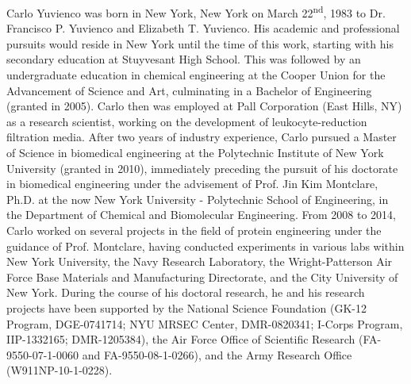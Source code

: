 Carlo Yuvienco was born in New York, New York on March 22\textsuperscript{nd},
1983 to Dr. Francisco P. Yuvienco and Elizabeth T. Yuvienco. His academic and
professional pursuits would reside in New York until the time of this work,
starting with his secondary education at Stuyvesant High School. This was
followed by an undergraduate education in chemical engineering at the Cooper
Union for the Advancement of Science and Art, culminating in a Bachelor of
Engineering (granted in 2005). Carlo then was employed at Pall Corporation (East
Hills, NY) as a research scientist, working on the development of
leukocyte-reduction filtration media. After two years of industry experience,
Carlo pursued a Master of Science in biomedical engineering at the Polytechnic
Institute of New York University (granted in 2010), immediately preceding the
pursuit of his doctorate in biomedical engineering under the advisement of Prof.
Jin Kim Montclare, Ph.D. at the now New York University - Polytechnic School of
Engineering, in the Department of Chemical and Biomolecular Engineering. From
2008 to 2014, Carlo worked on several projects in the field of protein
engineering under the guidance of Prof. Montclare, having conducted experiments
in various labs within New York University, the Navy Research Laboratory, the
Wright-Patterson Air Force Base Materials and Manufacturing Directorate, and the
City University of New York. During the course of his doctoral research, he and
his research projects have been supported by the National Science Foundation
(GK-12 Program, DGE-0741714; NYU MRSEC Center, DMR-0820341; I-Corps Program,
IIP-1332165; DMR-1205384), the Air Force Office of Scientific Research
(FA-9550-07-1-0060 and FA-9550-08-1-0266), and the Army Research Office
(W911NP-10-1-0228).
